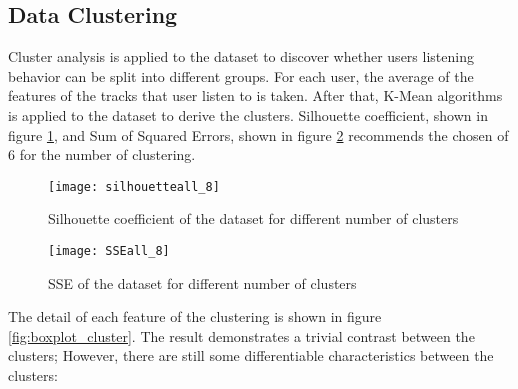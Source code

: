 \subsection{Data Clustering}
Cluster analysis is applied to the dataset to discover whether users listening behavior can be split into different groups. For each user, the average of the features of the tracks that user listen to is taken. After that, K-Mean algorithms is applied to the dataset to derive the clusters. Silhouette coefficient, shown in figure \ref{fig:Silhouette}, and Sum of Squared Errors, shown in figure \ref{fig:SSE} recommends the chosen of 6 for the number of clustering. 

\begin{figure}
	\texttt{[image: silhouetteall\_8]}
	\centering
	 \caption{Silhouette coefficient of the dataset for different number of clusters}
    \label{fig:Silhouette}
\end{figure}

\begin{figure}
	\texttt{[image: SSEall\_8]}
	\centering
	 \caption{SSE of the dataset for different number of clusters}
    \label{fig:SSE}
\end{figure}

\noindent The detail of each feature of the clustering is shown in figure \ref{fig:boxplot_cluster}. The result demonstrates a trivial contrast between the clusters; However, there are still some differentiable characteristics between the clusters:


